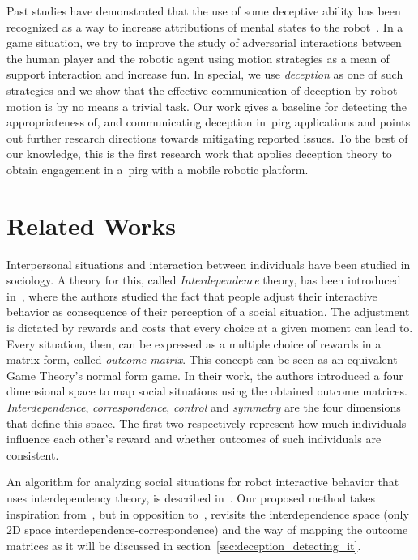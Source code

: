 Past studies have demonstrated that the use of some deceptive ability has been recognized as a way to increase attributions of mental states to the robot~\citep{shim_taxonomy_2013}. In a game situation, we try to improve the study of adversarial interactions between the human player and the robotic agent using motion strategies as a mean of support interaction and increase fun. In special, we use \textit{deception} as one of such strategies and we show that the effective communication of deception by robot motion is by no means a trivial task. Our work gives a baseline for detecting the appropriateness of, and communicating deception in~\gls{pirg} applications and points out further research directions towards mitigating reported issues. To the best of our knowledge, this is the first research work that applies deception theory to obtain engagement in a~\gls{pirg} with a mobile robotic platform.

\section{Related Works}\label{sec:deception_related_works}

Interpersonal situations and interaction between individuals have been studied in sociology. A theory for this, called \textit{Interdependence} theory, has been introduced in~\cite{kelley_interpersonal_1978}, where the authors studied the fact that people adjust their interactive behavior as consequence of their perception of a social situation. The adjustment is dictated by rewards and costs that every choice at a given moment can lead to. Every situation, then, can be expressed as a multiple choice of rewards in a matrix form, called \textit{outcome matrix}. This concept can be seen as an equivalent Game Theory's normal form game. 
In their work, the authors introduced a four dimensional space to map social situations using the obtained outcome matrices. \textit{Interdependence}, \textit{correspondence}, \textit{control} and \textit{symmetry} are the four dimensions that define this space. The first two respectively represent how much individuals influence each other's reward and whether outcomes of such individuals are consistent. 

An algorithm for analyzing social situations for robot interactive behavior that uses interdependency theory, is described in~\cite{wagner_analyzing_2008}. Our proposed method takes inspiration from~\cite{kelley_interpersonal_1978}, but in opposition to~\cite{wagner_analyzing_2008}, revisits the interdependence space (only 2D space interdependence-correspondence) and the way of mapping the outcome matrices as it will be discussed in section~\ref{sec:deception_detecting_it}.

